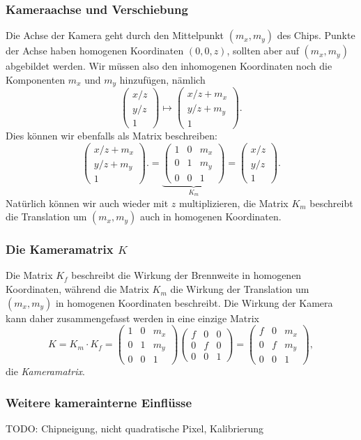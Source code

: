 \subsubsection{Kameraachse und Verschiebung}
Die Achse der Kamera geht durch den Mittelpunkt $(m_x,m_y)$ des Chips.
Punkte der Achse haben homogenen Koordinaten $(0,0,z)$, sollten aber
auf $(m_x,m_y)$ abgebildet werden.
Wir müssen also den inhomogenen Koordinaten noch die Komponenten
$m_x$ und $m_y$ hinzufügen, nämlich
\[
\begin{pmatrix} x/z \\ y/z \\ 1 \end{pmatrix}
\mapsto
\begin{pmatrix} x/z +m_x\\ y/z +m_y\\ 1 \end{pmatrix}.
\]
Dies können wir ebenfalls als Matrix beschreiben:
\[
\begin{pmatrix} x/z +m_x\\ y/z +m_y\\ 1 \end{pmatrix}.
=
\underbrace{
\begin{pmatrix}
1&0&m_x\\
0&1&m_y\\
0&0&1
\end{pmatrix}
}_{\displaystyle K_m}
=
\begin{pmatrix} x/z \\ y/z \\ 1 \end{pmatrix}.
\]
Natürlich können wir auch wieder mit $z$ multiplizieren, die Matrix
$K_m$ beschreibt die Translation um $(m_x,m_y)$ auch in homogenen
Koordinaten.

\subsubsection{Die Kameramatrix $K$}
Die Matrix $K_f$ beschreibt die Wirkung der Brennweite in homogenen
Koordinaten, während die Matrix $K_m$ die Wirkung der Translation um
$(m_x,m_y)$ in homogenen Koordinaten beschreibt.
Die Wirkung der Kamera kann daher zusammengefasst werden in eine einzige
Matrix
\[
K
=
K_m\cdot K_f
=
\begin{pmatrix}
1&0&m_x\\
0&1&m_y\\
0&0&1
\end{pmatrix}
\begin{pmatrix}
f&0&0\\
0&f&0\\
0&0&1
\end{pmatrix}
=
\begin{pmatrix}
f&0&m_x\\
0&f&m_y\\
0&0&1
\end{pmatrix},
\]
die {\em Kameramatrix}.
%

\subsubsection{Weitere kamerainterne Einflüsse}
TODO: Chipneigung, nicht quadratische Pixel, Kalibrierung



